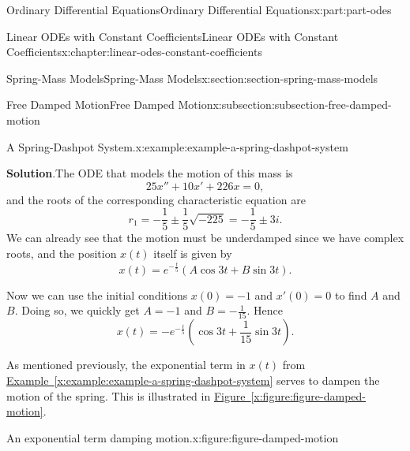 \documentclass[oneside,10pt,]{book}
\newcommand{\blocktitlefont}{\relax}
\newcommand{\xreffont}{\relax}
\numberwithin{equation}{part}
\begin{document}
\begin{partptx}{Ordinary Differential Equations}{}{Ordinary Differential Equations}{}{}{x:part:part-odes}
\begin{chapterptx}{Linear ODEs with Constant Coefficients}{}{Linear ODEs with Constant Coefficients}{}{}{x:chapter:linear-odes-constant-coefficients}
\begin{sectionptx}{Spring-Mass Models}{}{Spring-Mass Models}{}{}{x:section:section-spring-mass-models}
\begin{subsectionptx}{Free Damped Motion}{}{Free Damped Motion}{}{}{x:subsection:subsection-free-damped-motion}
\begin{example}{A Spring-Dashpot System.}{x:example:example-a-spring-dashpot-system}
\par\smallskip%
\noindent\textbf{\blocktitlefont Solution}.\hypertarget{g:solution:idp105548780483360}{}\quad{}The ODE that models the motion of this mass is%
\begin{equation*}
25x'' + 10x' + 226x = 0,
\end{equation*}
and the roots of the corresponding characteristic equation are%
\begin{equation*}
r_{1} = -\frac{1}{5} \pm \frac{1}{5}\sqrt{-225} = -\frac{1}{5}\pm3i.
\end{equation*}
We can already see that the motion must be underdamped since we have complex roots, and the position \(x(t)\) itself is given by%
\begin{equation*}
x(t) = e^{-\frac{t}{5}}(A\cos3t + B\sin3t).
\end{equation*}
%
\par
Now we can use the initial conditions \(x(0) = -1\) and \(x'(0) = 0\) to find \(A\) and \(B\). Doing so, we quickly get \(A = -1\) and \(B = -\frac{1}{15}\). Hence%
\begin{equation*}
x(t) = -e^{-\frac{t}{5}}\left(\cos3t + \frac{1}{15}\sin3t\right).
\end{equation*}
%
\end{example}
As mentioned previously, the exponential term in \(x(t)\) from \hyperref[x:example:example-a-spring-dashpot-system]{Example~{\xreffont\ref{x:example:example-a-spring-dashpot-system}}} serves to dampen the motion of the spring. This is illustrated in \hyperref[x:figure:figure-damped-motion]{Figure~{\xreffont\ref{x:figure:figure-damped-motion}}}.%
\begin{figureptx}{An exponential term damping motion.}{x:figure:figure-damped-motion}{}%
\begin{image}{0.25}{0.5}{0.25}%
\end{image}
\end{figureptx}
\end{subsectionptx}
\end{sectionptx}
\end{chapterptx}
\end{partptx}
\end{document}
